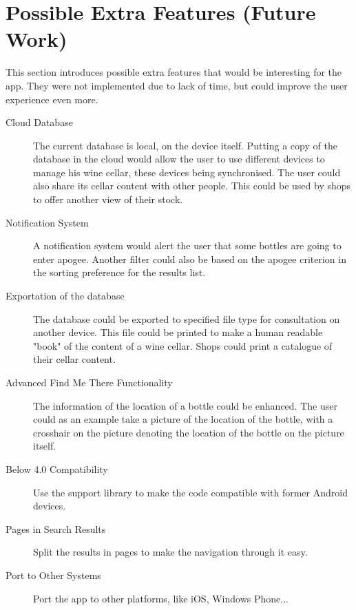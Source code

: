 
\section{Possible Extra Features (Future Work)}

This section introduces possible extra features that would be interesting for the app. They were not implemented due to lack of time, but could improve the user experience even more.

\begin{description}
	\item[Cloud Database] The current database is local, on the device itself. Putting a copy of the database in the cloud would allow the user to use different devices to manage his wine cellar, these devices being synchronised. The user could also share its cellar content with other people. This could be used by shops to offer another view of their stock.
	
	\item[Notification System] A notification system would alert the user that some bottles are going to enter apogee. Another filter could also be based on the apogee criterion in the sorting preference for the results list.
	
	\item[Exportation of the database] The database could be exported to specified file type for consultation on another device. This file could be printed to make a human readable "book" of the content of a wine cellar. Shops could print a catalogue of their cellar content.
	
	\item[Advanced Find Me There Functionality] The information of the location of a bottle could be enhanced. The user could as an example take a picture of the location of the bottle, with a crosshair on the picture denoting the location of the bottle on the picture itself.
	
	\item[Below 4.0 Compatibility] Use the support library to make the code compatible with former Android devices.
	
	\item[Pages in Search Results] Split the results in pages to make the navigation through it easy.
	
	\item[Port to Other Systems] Port the app to other platforms, like iOS, Windows Phone...
\end{description}

